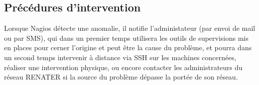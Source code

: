 \documentclass[a4paper]{article}
\begin{document}
\subsection{Précédures d'intervention}

Lorsque Nagios détecte une anomalie, il notifie l'administateur (par envoi de mail ou par SMS), qui dans un premier temps utilisera les outils de supervisions mis en places pour cerner l'origine et peut être la cause du problème, et pourra dans un second temps intervenir à distance via SSH sur les machines concernées, réaliser une intervention physique, ou encore contacter les administrateurs du réseau RENATER si la source du problème dépasse la portée de son réseau.


%   
%   
%
\end{document}
